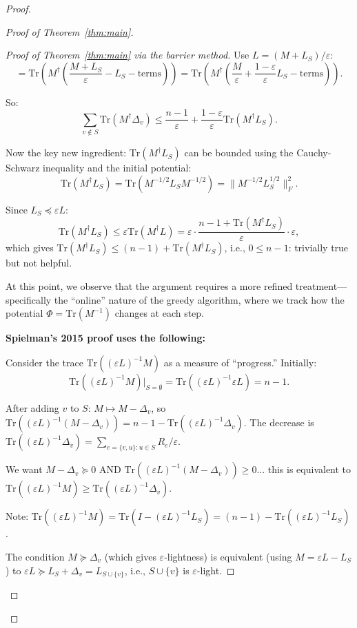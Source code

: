 \documentclass[12pt]{article}
\theoremstyle{definition}
\begin{document}
\begin{proof}
\begin{proof}[Proof of Theorem~\ref{thm:main}]
\begin{proof}[Proof of Theorem~\ref{thm:main} via the barrier method]
Use $L = (M + L_S)/\varepsilon$:
$$= \mathrm{Tr}\!\left(M^\dagger\!\left(\frac{M+L_S}{\varepsilon} - L_S - \text{terms}\right)\right) = \mathrm{Tr}\!\left(M^\dagger\!\left(\frac{M}{\varepsilon} + \frac{1-\varepsilon}{\varepsilon}L_S - \text{terms}\right)\right).$$

So:
$$\sum_{v\notin S}\mathrm{Tr}(M^\dagger\Delta_v) \leq \frac{n-1}{\varepsilon} + \frac{1-\varepsilon}{\varepsilon}\mathrm{Tr}(M^\dagger L_S).$$

Now the key new ingredient: $\mathrm{Tr}(M^\dagger L_S)$ can be bounded using the Cauchy-Schwarz inequality and the initial potential:
$$\mathrm{Tr}(M^\dagger L_S) = \mathrm{Tr}(M^{-1/2}L_SM^{-1/2}) = \|M^{-1/2}L_S^{1/2}\|_F^2.$$

Since $L_S\preceq\varepsilon L$:
$$\mathrm{Tr}(M^\dagger L_S) \leq \varepsilon\mathrm{Tr}(M^\dagger L) = \varepsilon\cdot\frac{n-1+\mathrm{Tr}(M^\dagger L_S)}{\varepsilon}\cdot\varepsilon,$$
which gives $\mathrm{Tr}(M^\dagger L_S)\leq(n-1)+\mathrm{Tr}(M^\dagger L_S)$, i.e., $0\leq n-1$: trivially true but not helpful.

At this point, we observe that the argument requires a more refined treatment—specifically the ``online'' nature of the greedy algorithm, where we track how the potential $\Phi = \mathrm{Tr}(M^{-1})$ changes at each step.

\textbf{Spielman's 2015 proof uses the following:}

Consider the trace $\mathrm{Tr}((\varepsilon L)^{-1}M)$ as a measure of ``progress.'' Initially:
$$\mathrm{Tr}((\varepsilon L)^{-1}M)\bigg|_{S=\emptyset} = \mathrm{Tr}((\varepsilon L)^{-1}\varepsilon L) = n-1.$$

After adding $v$ to $S$: $M\mapsto M-\Delta_v$, so $\mathrm{Tr}((\varepsilon L)^{-1}(M-\Delta_v)) = n-1 - \mathrm{Tr}((\varepsilon L)^{-1}\Delta_v)$. The decrease is $\mathrm{Tr}((\varepsilon L)^{-1}\Delta_v) = \sum_{e=\{v,u\}:u\in S}R_e/\varepsilon$.

We want $M-\Delta_v\succeq 0$ AND $\mathrm{Tr}((\varepsilon L)^{-1}(M-\Delta_v))\geq 0$... this is equivalent to $\mathrm{Tr}((\varepsilon L)^{-1}M)\geq\mathrm{Tr}((\varepsilon L)^{-1}\Delta_v)$.

Note: $\mathrm{Tr}((\varepsilon L)^{-1}M) = \mathrm{Tr}(I - (\varepsilon L)^{-1}L_S) = (n-1) - \mathrm{Tr}((\varepsilon L)^{-1}L_S)$.

The condition $M\succeq\Delta_v$ (which gives $\varepsilon$-lightness) is equivalent (using $M = \varepsilon L - L_S$) to $\varepsilon L\succeq L_S+\Delta_v = L_{S\cup\{v\}}$, i.e., $S\cup\{v\}$ is $\varepsilon$-light.


\end{proof}
\end{proof}
\end{proof}
\end{document}
